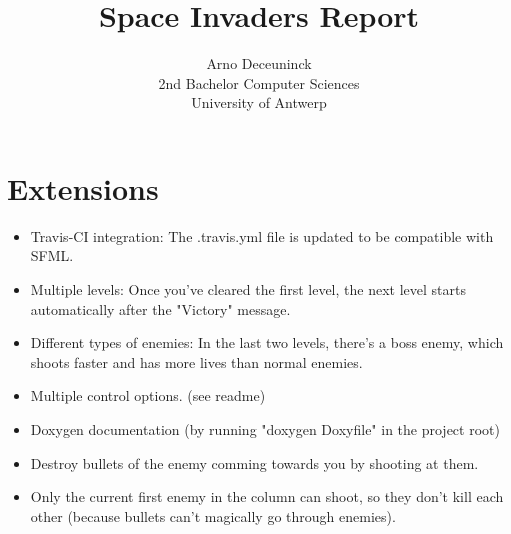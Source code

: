 \documentclass{article}
\title{Space Invaders Report}
\author{Arno Deceuninck\\ 2nd Bachelor Computer Sciences \\ University of Antwerp}
\begin{document}
    \maketitle

    \section{Extensions}
    \begin{itemize}
        \item Travis-CI integration: The .travis.yml file is updated to be compatible with SFML.
        \item Multiple levels: Once you've cleared the first level, the next level starts automatically after the "Victory" message.
        \item Different types of enemies: In the last two levels, there's a boss enemy, which shoots faster and has more lives than normal enemies.
        \item Multiple control options. (see readme)
        \item Doxygen documentation (by running "doxygen Doxyfile" in the project root)
        \item Destroy bullets of the enemy comming towards you by shooting at them.
        \item Only the current first enemy in the column can shoot, so they don't kill each other (because bullets can't magically go through enemies).
    \end{itemize}
\end{document}
